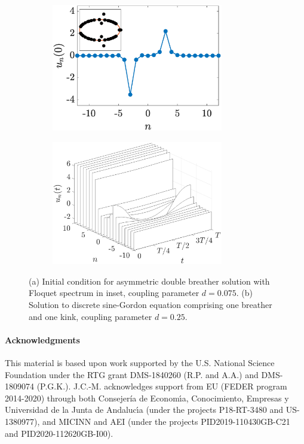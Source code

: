 \documentclass[12pt,reqno]{amsart}
\theoremstyle{definition}
\begin{document}
\begin{figure}
	\begin{center}
	\begin{subfigure}{0.45\linewidth}
		\caption{}
		\includegraphics[width=7.5cm]{images/doubleasymm.eps} 
		\label{fig:brka} 
	\end{subfigure}
	\begin{subfigure}{0.45\linewidth}
		\caption{}
		\includegraphics[width=7.5cm]{images/brk1.eps} 
		\label{fig:brkb} 
	\end{subfigure}
	\end{center}
	\caption{(a) Initial condition for asymmetric double breather solution with Floquet spectrum in inset, coupling parameter $d = 0.075$. (b) Solution to discrete sine-Gordon equation comprising one breather and one kink, coupling parameter $d = 0.25$.}
	\label{fig:brk}
\end{figure}

\vspace{0.5cm}

\paragraph{\textbf{Acknowledgments}}

This material is based upon work supported by the U.S. National Science Foundation under the RTG grant DMS-1840260 (R.P. and A.A.) and DMS-1809074 (P.G.K.). J.C.-M. acknowledges support from EU (FEDER program 2014-2020) through both Consejería de Econom\'{\i}a, Conocimiento, Empresas y Universidad de la Junta de Andaluc\'{\i}a (under the projects P18-RT-3480 and US-1380977), and MICINN and AEI (under the projects PID2019-110430GB-C21 and PID2020-112620GB-I00).
\end{document}
